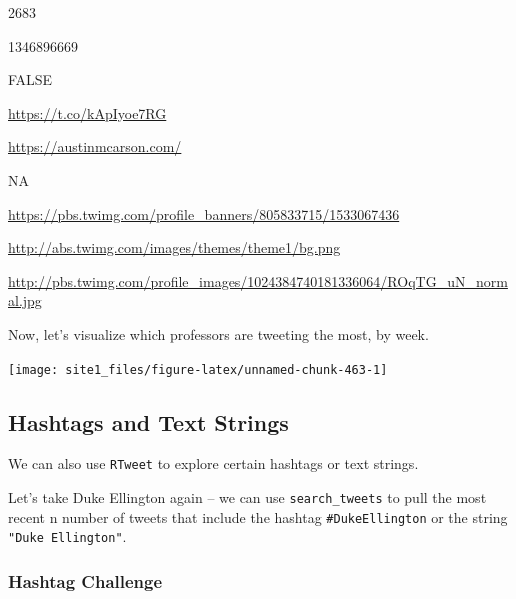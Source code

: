\documentclass[]{book}
\newenvironment{Shaded}{\begin{snugshade}}{\end{snugshade}}
\newcommand{\DataTypeTok}[1]{\textcolor[rgb]{0.13,0.29,0.53}{#1}}
\newcommand{\KeywordTok}[1]{\textcolor[rgb]{0.13,0.29,0.53}{\textbf{#1}}}
\newcommand{\NormalTok}[1]{#1}
\newcommand{\OperatorTok}[1]{\textcolor[rgb]{0.81,0.36,0.00}{\textbf{#1}}}
\newcommand{\StringTok}[1]{\textcolor[rgb]{0.31,0.60,0.02}{#1}}
\begin{document}
2683

1346896669

FALSE

\url{https://t.co/kApIyoe7RG}

\url{https://austinmcarson.com/}

NA

\url{https://pbs.twimg.com/profile_banners/805833715/1533067436}

\url{http://abs.twimg.com/images/themes/theme1/bg.png}

\url{http://pbs.twimg.com/profile_images/1024384740181336064/ROqTG_uN_normal.jpg}

Now, let's visualize which professors are tweeting the most, by week.

\begin{Shaded}
\end{Shaded}

\begin{center}\texttt{[image: site1\_files/figure-latex/unnamed-chunk-463-1]} \end{center}

\hypertarget{hashtags-and-text-strings}{%
\subsection{Hashtags and Text Strings}\label{hashtags-and-text-strings}}

We can also use \texttt{RTweet} to explore certain hashtags or text strings.

Let's take Duke Ellington again -- we can use \texttt{search\_tweets} to pull the most recent n number of tweets that include the hashtag \texttt{\#DukeEllington} or the string \texttt{"Duke\ Ellington"}.

\hypertarget{hashtag-challenge}{%
\subsubsection*{Hashtag Challenge}\label{hashtag-challenge}}
\end{document}
